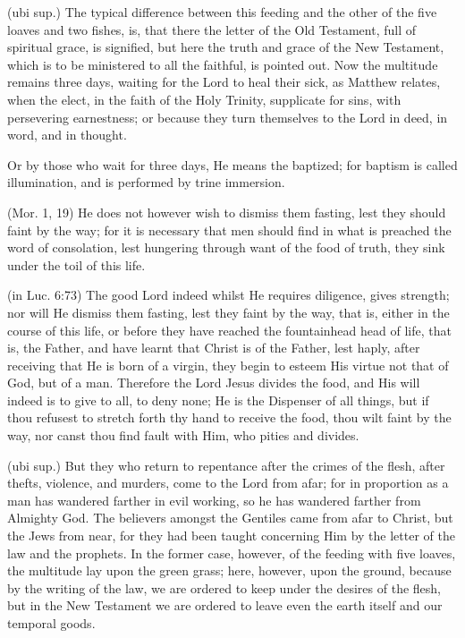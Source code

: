  (ubi sup.) The typical difference between this feeding and the other of the five loaves and two fishes, is, that there the letter of the Old Testament, full of spiritual grace, is signified, but here the truth and grace of the New Testament, which is to be ministered to all the faithful, is pointed out. Now the multitude remains three days, waiting for the Lord to heal their sick, as Matthew relates, when the elect, in the faith of the Holy Trinity, supplicate for sins, with persevering earnestness; or because they turn themselves to the Lord in deed, in word, and in thought.

 Or by those who wait for three days, He means the baptized; for baptism is called illumination, and is performed by trine immersion.

 (Mor. 1, 19) He does not however wish to dismiss them fasting, lest they should faint by the way; for it is necessary that men should find in what is preached the word of consolation, lest hungering through want of the food of truth, they sink under the toil of this life.

 (in Luc. 6:73) The good Lord indeed whilst He requires diligence, gives strength; nor will He dismiss them fasting, lest they faint by the way, that is, either in the course of this life, or before they have reached the fountainhead head of life, that is, the Father, and have learnt that Christ is of the Father, lest haply, after receiving that He is born of a virgin, they begin to esteem His virtue not that of God, but of a man. Therefore the Lord Jesus divides the food, and His will indeed is to give to all, to deny none; He is the Dispenser of all things, but if thou refusest to stretch forth thy hand to receive the food, thou wilt faint by the way, nor canst thou find fault with Him, who pities and divides.

 (ubi sup.) But they who return to repentance after the crimes of the flesh, after thefts, violence, and murders, come to the Lord from afar; for in proportion as a man has wandered farther in evil working, so he has wandered farther from Almighty God. The believers amongst the Gentiles came from afar to Christ, but the Jews from near, for they had been taught concerning Him by the letter of the law and the prophets. In the former case, however, of the feeding with five loaves, the multitude lay upon the green grass; here, however, upon the ground, because by the writing of the law, we are ordered to keep under the desires of the flesh, but in the New Testament we are ordered to leave even the earth itself and our temporal goods.

